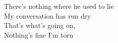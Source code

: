 There's nothing where he used to lie\\
My conversation has run dry \\
That's what's going on, \\
Nothing's fine I'm torn \\


